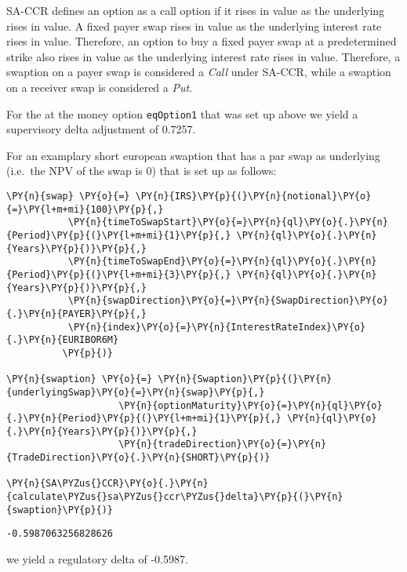 SA-CCR defines an option as a call option if it rises in value as the
underlying rises in value. A fixed payer swap rises in value as the
underlying interest rate rises in value. Therefore, an option to buy a
fixed payer swap at a predetermined strike also rises in value as the
underlying interest rate rises in value. Therefore, a swaption on a
payer swap is considered a \emph{Call} under SA-CCR, while a swaption on
a receiver swap is considered a \emph{Put}.

    For the at the money option \texttt{eqOption1} that was set up above we
yield a supervisory delta adjustment of 0.7257.

    
    For an examplary short european swaption that has a par swap as
underlying (i.e.~the NPV of the swap is 0) that is set up as follows:

    \begin{tcolorbox}[breakable, size=fbox, boxrule=1pt, pad at break*=1mm,colback=cellbackground, colframe=cellborder]
\begin{Verbatim}[commandchars=\\\{\}]
\PY{n}{swap} \PY{o}{=} \PY{n}{IRS}\PY{p}{(}\PY{n}{notional}\PY{o}{=}\PY{l+m+mi}{100}\PY{p}{,}
           \PY{n}{timeToSwapStart}\PY{o}{=}\PY{n}{ql}\PY{o}{.}\PY{n}{Period}\PY{p}{(}\PY{l+m+mi}{1}\PY{p}{,} \PY{n}{ql}\PY{o}{.}\PY{n}{Years}\PY{p}{)}\PY{p}{,}
           \PY{n}{timeToSwapEnd}\PY{o}{=}\PY{n}{ql}\PY{o}{.}\PY{n}{Period}\PY{p}{(}\PY{l+m+mi}{3}\PY{p}{,} \PY{n}{ql}\PY{o}{.}\PY{n}{Years}\PY{p}{)}\PY{p}{,}
           \PY{n}{swapDirection}\PY{o}{=}\PY{n}{SwapDirection}\PY{o}{.}\PY{n}{PAYER}\PY{p}{,}
           \PY{n}{index}\PY{o}{=}\PY{n}{InterestRateIndex}\PY{o}{.}\PY{n}{EURIBOR6M}
          \PY{p}{)}

\PY{n}{swaption} \PY{o}{=} \PY{n}{Swaption}\PY{p}{(}\PY{n}{underlyingSwap}\PY{o}{=}\PY{n}{swap}\PY{p}{,}
                    \PY{n}{optionMaturity}\PY{o}{=}\PY{n}{ql}\PY{o}{.}\PY{n}{Period}\PY{p}{(}\PY{l+m+mi}{1}\PY{p}{,} \PY{n}{ql}\PY{o}{.}\PY{n}{Years}\PY{p}{)}\PY{p}{,}
                    \PY{n}{tradeDirection}\PY{o}{=}\PY{n}{TradeDirection}\PY{o}{.}\PY{n}{SHORT}\PY{p}{)}

\PY{n}{SA\PYZus{}CCR}\PY{o}{.}\PY{n}{calculate\PYZus{}sa\PYZus{}ccr\PYZus{}delta}\PY{p}{(}\PY{n}{swaption}\PY{p}{)}
\end{Verbatim}
\end{tcolorbox}

            \begin{tcolorbox}[breakable, size=fbox, boxrule=.5pt, pad at break*=1mm, opacityfill=0]
\begin{Verbatim}[commandchars=\\\{\}]
-0.5987063256828626
\end{Verbatim}
\end{tcolorbox}
        
    we yield a regulatory delta of -0.5987.

    

